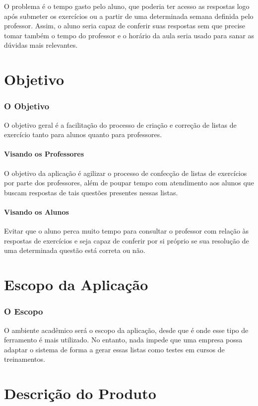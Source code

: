 \documentclass[12pt,oneside,a4paper,article]{abntex2}
\begin{document}
			O problema é o tempo gasto pelo aluno, que poderia ter acesso as respostas logo após submeter os exercícios ou a partir de uma determinada semana definida pelo professor. Assim, o aluno seria capaz de conferir suas respostas sem que precise tomar também o tempo do professor e o horário da aula seria usado para sanar as dúvidas mais relevantes.
			
\part{Objetivo}
	\section{O Objetivo}
		O objetivo geral é a facilitação do processo de criação e correção de listas de exercício tanto para alunos quanto para professores.
		\subsection{Visando os Professores}
			O objetivo da aplicação é agilizar o processo de confecção de listas de exercícios por parte dos professores, além de poupar tempo com atendimento aos alunos que buscam respostas de tais questões presentes nessas listas.

		\subsection{Visando os Alunos}
			Evitar que o aluno perca muito tempo para consultar o professor com relação às respostas de exercícios e seja capaz de conferir por si próprio se sua resolução de uma determinada questão está correta ou não.
			
\part{Escopo da Aplicação}
	\section{O Escopo}
		O ambiente acadêmico será o escopo da aplicação, desde que é onde esse tipo de ferramento é mais utilizado. No entanto, nada impede que uma empresa possa adaptar o sistema de forma a gerar essas listas como testes em cursos de treinamentos.

\part{Descrição do Produto}
\end{document}
